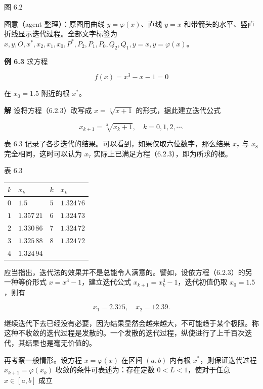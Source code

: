 \documentclass[
  10pt,
  fontset=fandol]{ctexart}
\newcounter{none} %
\begin{document}
图 6.2

图意（agent 整理）：原图用曲线 \(y=\varphi(x)\)、直线 \(y=x\) 和带箭头的水平、竖直折线显示迭代过程。全部文字标签为 \(x,\allowbreak y,\allowbreak O,\allowbreak x^*,\allowbreak x_2,\allowbreak x_1,\allowbreak x_0,\allowbreak P^*,\allowbreak P_2,\allowbreak P_1,\allowbreak P_0,\allowbreak Q_2,\allowbreak Q_1,\allowbreak y=x,\allowbreak y=\varphi(x)\)。

\textbf{例 6.3} 求方程

\[
f(x)=x^3-x-1=0
\tag{6.2.3}
\]

在 \(x_0=1.5\) 附近的根 \(x^*\)。

\textbf{解} 设将方程（6.2.3）改写成 \(x=\sqrt[3]{x+1}\) 的形式，据此建立迭代公式

\[
x_{k+1}=\sqrt[3]{x_k+1},\quad k=0,1,2,\cdots.
\]

表 6.3 记录了各步迭代的结果。可以看到，如果仅取六位数字，那么结果 \(x_7\) 与 \(x_8\) 完全相同，这时可以认为 \(x_7\) 实际上已满足方程（6.2.3），即为所求的根。

表 6.3

{\def\LTcaptype{none} %
\begin{longtable}[]{@{}llll@{}}
\toprule\noalign{}
\(k\) & \(x_k\) & \(k\) & \(x_k\) \\
\midrule\noalign{}
\endhead
\bottomrule\noalign{}
\endlastfoot
\(0\) & \(1.5\) & \(5\) & \(1.324\,76\) \\
\(1\) & \(1.357\,21\) & \(6\) & \(1.324\,73\) \\
\(2\) & \(1.330\,86\) & \(7\) & \(1.324\,72\) \\
\(3\) & \(1.325\,88\) & \(8\) & \(1.324\,72\) \\
\(4\) & \(1.324\,94\) & & \\
\end{longtable}
}

应当指出，迭代法的效果并不是总能令人满意的。譬如，设依方程（6.2.3）的另一种等价形式 \(x=x^3-1\)，建立迭代公式 \(x_{k+1}=x_k^3-1\)，迭代初值仍取 \(x_0=1.5\)，则有

\[
x_1=2.375,\quad x_2=12.39.
\]

继续迭代下去已经没有必要，因为结果显然会越来越大，不可能趋于某个极限。称这种不收敛的迭代过程是发散的。一个发散的迭代过程，纵使进行了上千百次迭代，其结果也是毫无价值的。

再考察一般情形。设方程 \(x=\varphi(x)\) 在区间 \((a,b)\) 内有根 \(x^*\)，则保证迭代过程 \(x_{k+1}=\varphi(x_k)\) 收敛的条件可表述为：存在定数 \(0<L<1\)，使对于任意 \(x\in[a,b]\) 成立
\end{document}
